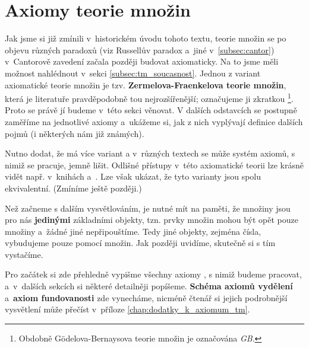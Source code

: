 \chapter{Axiomy teorie množin}\label{chap:axiomy_tm}
Jak jsme si již zmínili v~historickém úvodu tohoto textu, teorie množin se po objevu různých paradoxů (viz Russellův paradox a~jiné v~\ref{subsec:cantor}) v~Cantorově zavedení začala později budovat axiomaticky. Na to jsme měli možnost nahlédnout v~sekci \ref{subsec:tm_soucasnost}. Jednou z variant axiomatické teorie množin je tzv. \textbf{\mbox{Zermelova-Fraenkelova} teorie množin}, která je literatuře pravděpodobně tou nejrozšířenější; označujeme ji zkratkou \emph{\ZF{}}\footnote{Obdobně Gödelova-Bernaysova teorie množin je označována \emph{\textsf{GB}}.}. Proto se právě jí budeme v~této sekci věnovat. V dalších odstavcích se postupně zaměříme na jednotlivé axiomy \ZF{} a~ukážeme si, jak z nich vyplývají definice dalších pojmů (i některých nám již známých).\par
Nutno dodat, že \ZF{} má více variant a v~různých textech se může systém axiomů, s nimiž se pracuje, jemně lišit. Odlišné přístupy v~této axiomatické teorii lze krásně vidět např. v~knihách \cite{BalcarStepanek1986} a~\cite{Goldrei2017}. Lze však ukázat, že tyto varianty jsou spolu ekvivalentní. (Zmíníme ještě později.)\par
Než začneme s dalším vysvětlováním, je nutné mít na paměti, že množiny jsou pro nás \textbf{jedinými} základními objekty, tzn. prvky množin mohou být opět pouze množiny a~žádné jiné nepřipouštíme. Tedy jiné objekty, zejména čísla, vybudujeme pouze pomocí množin. Jak později uvidíme, skutečně si s tím vystačíme.\par
Pro začátek si zde přehledně vypišme všechny axiomy \ZF{}, s nimiž budeme pracovat, a~v~dalších sekcích si některé detailněji popíšeme. \textbf{Schéma axiomů vydělení} a~\textbf{axiom fundovanosti} zde vynecháme, nicméně čtenář si jejich podrobnější vysvětlení může přečíst v~příloze \ref{chap:dodatky_k_axiomum_tm}.
\medskip

